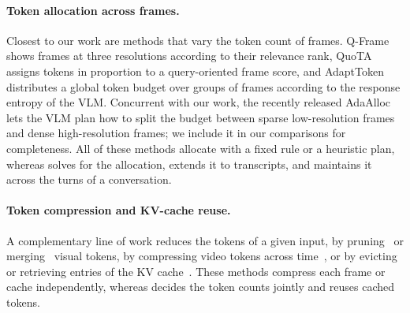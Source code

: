 \paragraph{Token allocation across frames.}
Closest to our work are methods that vary the token count of frames. Q-Frame~\cite{zhang2025qframe} shows frames at
three resolutions according to their relevance rank, QuoTA~\cite{luo2025quota} assigns tokens in proportion to a
query-oriented frame score, and AdaptToken~\cite{qi2026adapttoken} distributes a global token budget over groups of
frames according to the response entropy of the VLM. Concurrent with our work, the recently released
AdaAlloc~\cite{an2026adaalloc} lets the VLM plan how to split the budget between sparse low-resolution frames and
dense high-resolution frames; we include it in our comparisons for completeness. All of these
methods allocate with a fixed rule or a heuristic plan, whereas \name solves for the allocation, extends it to
transcripts, and maintains it across the turns of a conversation.

\paragraph{Token compression and KV-cache reuse.}
A complementary line of work reduces the tokens of a given input, by pruning~\cite{chen2024fastv,yang2024visionzip} or
merging~\cite{bolya2023tome} visual tokens, by compressing video tokens across
time~\cite{shen2024longvu,tao2024dycoke,wu2026marc}, or by evicting or retrieving entries of the KV
cache~\cite{zhang2023h2o,xiao2024streamingllm,rekv2025}. These methods compress each frame or cache
independently, whereas \name decides the token counts jointly and reuses cached tokens.
